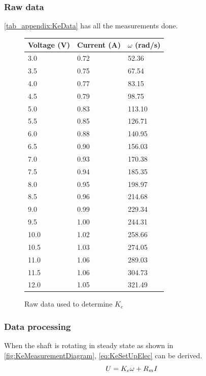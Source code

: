 \subsubsection*{Raw data}
\autoref{tab_appendix:KeData} has all the measurements done.
\begin{figure}[htbp]
	\centering
	\caption{Raw data used to determine $K_e$}\label{tab_appendix:KeData}
	\begin{tabularx}{0.55\textwidth}{lXX}
		Voltage (V) & Current (A) & $\omega$ (rad/s)\\ \toprule \rowcolor{lightGrey}
		3.0  & 0.72 & 52.36  \\
		3.5  & 0.75 & 67.54  \\ \rowcolor{lightGrey}
		4.0  & 0.77 & 83.15  \\
		4.5  & 0.79 & 98.75  \\ \rowcolor{lightGrey}
		5.0  & 0.83 & 113.10 \\
		5.5  & 0.85 & 126.71 \\ \rowcolor{lightGrey}
		6.0  & 0.88 & 140.95 \\
		6.5  & 0.90 & 156.03 \\ \rowcolor{lightGrey}
		7.0  & 0.93 & 170.38 \\
		7.5  & 0.94 & 185.35 \\ \rowcolor{lightGrey}
		8.0  & 0.95 & 198.97 \\
		8.5  & 0.96 & 214.68 \\ \rowcolor{lightGrey}
		9.0  & 0.99 & 229.34 \\
		9.5  & 1.00 & 244.31 \\ \rowcolor{lightGrey}
		10.0 & 1.02 & 258.66 \\
		10.5 & 1.03 & 274.05 \\ \rowcolor{lightGrey}
		11.0 & 1.06 & 289.03 \\
		11.5 & 1.06 & 304.73 \\ \rowcolor{lightGrey}
		12.0 & 1.05 & 321.49
	\end{tabularx}
\end{figure}



\subsubsection*{Data processing}

When the shaft is rotating in steady state as shown in \autoref{fig:KeMeasurementDiagram}, \autoref{eq:KeSetUpElec} can be derived.
\begin{equation}
U=K_e\omega+R_m I \addunit{\volt}
\label{eq:KeSetUpElec}
\end{equation}

